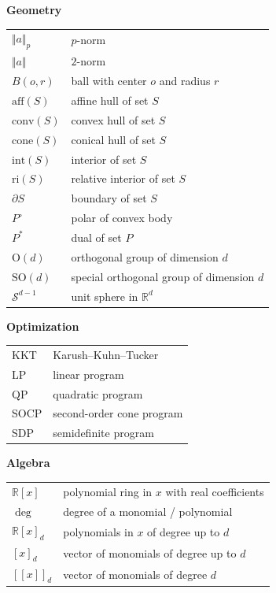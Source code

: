 \documentclass[
]{book}
\theoremstyle{definition}
\theoremstyle{definition}
\theoremstyle{definition}
\theoremstyle{definition}
\theoremstyle{remark}
\begin{document}
\textbf{Geometry}

\begin{longtable}[]{@{}ll@{}}
\toprule\noalign{}
\endhead
\bottomrule\noalign{}
\endlastfoot
\(\Vert a \Vert_{p}\) & \(p\)-norm \\
\(\Vert a \Vert\) & \(2\)-norm \\
\(B(o,r)\) & ball with center \(o\) and radius \(r\) \\
\(\mathrm{aff}(S)\) & affine hull of set \(S\) \\
\(\mathrm{conv}(S)\) & convex hull of set \(S\) \\
\(\mathrm{cone}(S)\) & conical hull of set \(S\) \\
\(\mathrm{int}(S)\) & interior of set \(S\) \\
\(\mathrm{ri}(S)\) & relative interior of set \(S\) \\
\(\partial S\) & boundary of set \(S\) \\
\(P^\circ\) & polar of convex body \\
\(P^{*}\) & dual of set \(P\) \\
\(\mathrm{O}(d)\) & orthogonal group of dimension \(d\) \\
\(\mathrm{SO}(d)\) & special orthogonal group of dimension \(d\) \\
\(\mathcal{S}^{d-1}\) & unit sphere in \(\mathbb{R}^{d}\) \\
\end{longtable}

\textbf{Optimization}

\begin{longtable}[]{@{}ll@{}}
\toprule\noalign{}
\endhead
\bottomrule\noalign{}
\endlastfoot
KKT & Karush--Kuhn--Tucker \\
LP & linear program \\
QP & quadratic program \\
SOCP & second-order cone program \\
SDP & semidefinite program \\
\end{longtable}

\textbf{Algebra}

\begin{longtable}[]{@{}ll@{}}
\toprule\noalign{}
\endhead
\bottomrule\noalign{}
\endlastfoot
\(\mathbb{R}[x]\) & polynomial ring in \(x\) with real coefficients \\
\(\deg\) & degree of a monomial / polynomial \\
\(\mathbb{R}[x]_d\) & polynomials in \(x\) of degree up to \(d\) \\
\([x]_d\) & vector of monomials of degree up to \(d\) \\
\([\![x ]\!]_d\) & vector of monomials of degree \(d\) \\
\end{longtable}
\end{document}
